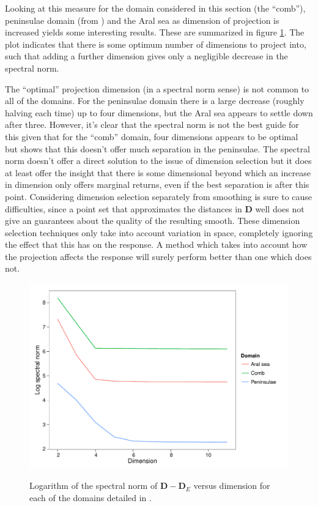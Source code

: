 Looking at this measure for the domain considered in this section (the ``comb''), peninsulae domain (from ) and the Aral sea as dimension of projection is increased yields some interesting results. These are summarized in figure \ref{increasek}. The plot indicates that there is some optimum number of dimensions to project into, such that adding a further dimension gives only a negligible decrease in the spectral norm. 

The ``optimal'' projection dimension (in a spectral norm sense) is not common to all of the domains. For the peninsulae domain there is a large decrease (roughly halving each time) up to four dimensions, but the Aral sea appears to settle down after three. However, it's clear that the spectral norm is not the best guide for this given that for the ``comb'' domain, four dimensions appears to be optimal but  shows that this doesn't offer much separation in the peninsulae. The spectral norm doesn't offer a direct solution to the issue of dimension selection but it does at least offer the insight that there is some dimensional beyond which an increase in dimension only offers marginal returns, even if the best separation is after this point. Considering dimension selection separately from smoothing is sure to cause difficulties, since a point set that approximates the distances in $\mathbf{D}$ well does not give an guarantees about the quality of the resulting smooth. These dimension selection techniques only take into account variation in space, completely ignoring the effect that this has on the response. A method which takes into account how the projection affects the response will surely perform better than one which does not.

\begin{figure}
\includegraphics[width=\textwidth]{mds/figs/eigenplot.pdf} \\
\caption{Logarithm of the spectral norm of $\mathbf{D}-\mathbf{D}_E$ versus dimension for each of the domains detailed in .\label{cor-r46}}
\label{increasek}
\end{figure}

